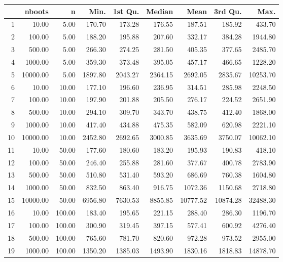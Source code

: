 \begin{table}[ht]
\centering
\begin{tabular}{rrrrrrrrr}
  \hline
 & nboots & n & Min. & 1st Qu. & Median & Mean & 3rd Qu. & Max. \\ 
  \hline
1 & 10.00 & 5.00 & 170.70 & 173.28 & 176.55 & 187.51 & 185.92 & 433.70 \\ 
  2 & 100.00 & 5.00 & 188.20 & 195.88 & 207.60 & 332.17 & 384.28 & 1944.80 \\ 
  3 & 500.00 & 5.00 & 266.30 & 274.25 & 281.50 & 405.35 & 377.65 & 2485.70 \\ 
  4 & 1000.00 & 5.00 & 359.30 & 373.48 & 395.05 & 457.17 & 466.65 & 1228.20 \\ 
  5 & 10000.00 & 5.00 & 1897.80 & 2043.27 & 2364.15 & 2692.05 & 2835.67 & 10253.70 \\ 
  6 & 10.00 & 10.00 & 177.10 & 196.60 & 236.95 & 314.51 & 285.98 & 2248.50 \\ 
  7 & 100.00 & 10.00 & 197.90 & 201.88 & 205.50 & 276.17 & 224.52 & 2651.90 \\ 
  8 & 500.00 & 10.00 & 294.10 & 309.70 & 343.70 & 438.75 & 412.40 & 1868.00 \\ 
  9 & 1000.00 & 10.00 & 417.40 & 434.88 & 475.35 & 582.09 & 620.98 & 2221.10 \\ 
  10 & 10000.00 & 10.00 & 2452.80 & 2692.65 & 3000.85 & 3635.69 & 3750.07 & 10062.10 \\ 
  11 & 10.00 & 50.00 & 177.60 & 180.60 & 183.20 & 195.93 & 190.83 & 418.10 \\ 
  12 & 100.00 & 50.00 & 246.40 & 255.88 & 281.60 & 377.67 & 400.78 & 2783.90 \\ 
  13 & 500.00 & 50.00 & 510.80 & 531.40 & 593.20 & 686.69 & 760.38 & 1604.80 \\ 
  14 & 1000.00 & 50.00 & 832.50 & 863.40 & 916.75 & 1072.36 & 1150.68 & 2718.80 \\ 
  15 & 10000.00 & 50.00 & 6956.80 & 7630.53 & 8855.85 & 10777.52 & 10874.28 & 32488.30 \\ 
  16 & 10.00 & 100.00 & 183.40 & 195.65 & 221.15 & 288.40 & 286.30 & 1196.70 \\ 
  17 & 100.00 & 100.00 & 300.90 & 319.45 & 397.15 & 577.41 & 600.92 & 4276.40 \\ 
  18 & 500.00 & 100.00 & 765.60 & 781.70 & 820.60 & 972.28 & 973.52 & 2955.00 \\ 
  19 & 1000.00 & 100.00 & 1350.20 & 1385.03 & 1493.90 & 1830.16 & 1818.83 & 14878.70 \\ 

\end{tabular}
\end{table}
